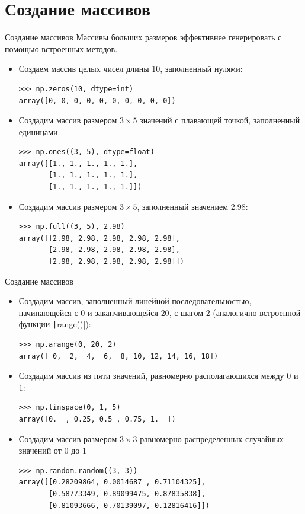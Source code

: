 \documentclass[aspectratio=169, mathserif]{beamer}	%
\begin{document}
\section{Создание массивов}
\begin{frame}[fragile]{Создание массивов}
\scriptsize
Массивы больших размеров эффективнее генерировать с помощью встроенных методов. 
\begin{itemize}
\item Создаем массив целых чисел длины 10, заполненный нулями:
\begin{verbatim}
>>> np.zeros(10, dtype=int)
array([0, 0, 0, 0, 0, 0, 0, 0, 0, 0])
\end{verbatim}
\item Создадим массив размером $3 \times 5$ значений с плавающей точкой, заполненный единицами:
\begin{verbatim}
>>> np.ones((3, 5), dtype=float)
array([[1., 1., 1., 1., 1.],
       [1., 1., 1., 1., 1.],
       [1., 1., 1., 1., 1.]])
\end{verbatim}
\item Создадим массив размером $3 \times 5$, заполненный значением $2.98$:
\begin{verbatim}
>>> np.full((3, 5), 2.98)
array([[2.98, 2.98, 2.98, 2.98, 2.98],
       [2.98, 2.98, 2.98, 2.98, 2.98],
       [2.98, 2.98, 2.98, 2.98, 2.98]])
\end{verbatim}
\end{itemize}
\vfill
\end{frame}

\begin{frame}[fragile]{Создание массивов}
\scriptsize
\begin{itemize}
\item Создадим массив, заполненный линейной последовательностью, начинающейся с $0$ и заканчивающейся $20$, с шагом $2$ (аналогично встроенной функции \texttt|range()|):
\begin{verbatim}
>>> np.arange(0, 20, 2)
array([ 0,  2,  4,  6,  8, 10, 12, 14, 16, 18])
\end{verbatim}
\item Создадим массив из пяти значений, равномерно располагающихся между $0$ и $1$:
\begin{verbatim}
>>> np.linspace(0, 1, 5)
array([0.  , 0.25, 0.5 , 0.75, 1.  ])
\end{verbatim}
\item Создадим массив размером $3 \times 3$ равномерно распределенных случайных значений от $0$ до $1$
\begin{verbatim}
>>> np.random.random((3, 3))
array([[0.28209864, 0.0014687 , 0.71104325],
       [0.58773349, 0.89099475, 0.87835838],
       [0.81093666, 0.70139097, 0.12816416]])
\end{verbatim}
\end{itemize}
\end{frame}
\end{document}
